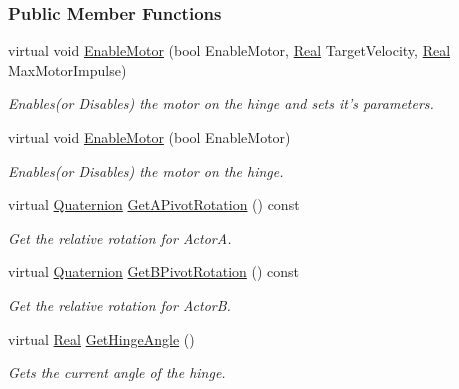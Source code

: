 \subsubsection*{Public Member Functions}
\begin{DoxyCompactItemize}
\item 
virtual void \hyperlink{classphys_1_1HingeConstraint_a90baa9ae0a582d42dc7757d14fd56299}{EnableMotor} (bool EnableMotor, \hyperlink{namespacephys_af7eb897198d265b8e868f45240230d5f}{Real} TargetVelocity, \hyperlink{namespacephys_af7eb897198d265b8e868f45240230d5f}{Real} MaxMotorImpulse)
\begin{DoxyCompactList}\small\item\em Enables(or Disables) the motor on the hinge and sets it's parameters. \item\end{DoxyCompactList}\item 
virtual void \hyperlink{classphys_1_1HingeConstraint_a0c6fdf316a60a34bf507b2de8960de49}{EnableMotor} (bool EnableMotor)
\begin{DoxyCompactList}\small\item\em Enables(or Disables) the motor on the hinge. \item\end{DoxyCompactList}\item 
virtual \hyperlink{classphys_1_1Quaternion}{Quaternion} \hyperlink{classphys_1_1HingeConstraint_acc2a3459cfbfef7dc7a211e3e7569358}{GetAPivotRotation} () const 
\begin{DoxyCompactList}\small\item\em Get the relative rotation for ActorA. \item\end{DoxyCompactList}\item 
virtual \hyperlink{classphys_1_1Quaternion}{Quaternion} \hyperlink{classphys_1_1HingeConstraint_a4039ca63ae04464b6d29193348f1e1ee}{GetBPivotRotation} () const 
\begin{DoxyCompactList}\small\item\em Get the relative rotation for ActorB. \item\end{DoxyCompactList}\item 
virtual \hyperlink{namespacephys_af7eb897198d265b8e868f45240230d5f}{Real} \hyperlink{classphys_1_1HingeConstraint_a272599bad7c7c6075efd53f2c63adc1f}{GetHingeAngle} ()
\begin{DoxyCompactList}\small\item\em Gets the current angle of the hinge. \item\end{DoxyCompactList}\item 

\end{DoxyCompactItemize}
